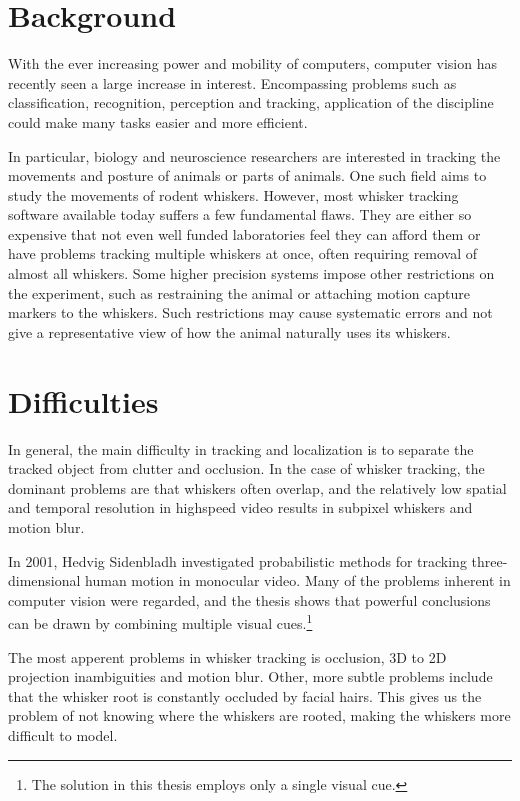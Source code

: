\section{Background}

With the ever increasing power and mobility of computers, computer
vision has recently seen a large increase in interest.  Encompassing
problems such as classification, recognition, perception and tracking,
application of the discipline could make many tasks easier and more
efficient.

In particular, biology and neuroscience researchers are interested in
tracking the movements and posture \cite{WhiskerVideography} of
animals or parts of animals.  One such field aims to study the
movements of rodent whiskers. However, most whisker tracking software
available today suffers a few fundamental flaws.  They are either so
expensive that not even well funded laboratories feel they can afford
them or have problems tracking multiple whiskers at once, often
requiring removal of almost all whiskers.  Some higher precision
systems impose other restrictions on the experiment, such as
restraining the animal or attaching motion capture markers to the
whiskers. \cite{BadExample1} Such restrictions may cause systematic
errors and not give a representative view of how the animal naturally
uses its whiskers.

\section{Difficulties}
In general, the main difficulty in tracking and localization is to
separate the tracked object from clutter and occlusion. In the case of
whisker tracking, the dominant problems are that whiskers often
overlap, and the relatively low spatial and temporal resolution in
highspeed video results in subpixel whiskers and motion
blur. \cite{WhiskerVideography}

In 2001, Hedvig Sidenbladh investigated probabilistic methods for
tracking three-dimensional human motion in monocular
video. \cite{Hedvig} Many of the problems inherent in computer vision
were regarded, and the thesis shows that powerful conclusions can be
drawn by combining multiple visual cues.\footnote{The solution in this
thesis employs only a single visual cue.}

The most apperent problems in whisker tracking is occlusion, 3D to 2D
projection inambiguities and motion blur. Other, more subtle problems
include that the whisker root is constantly occluded by facial
hairs. This gives us the problem of not knowing where the whiskers are
rooted, making the whiskers more difficult to model.

